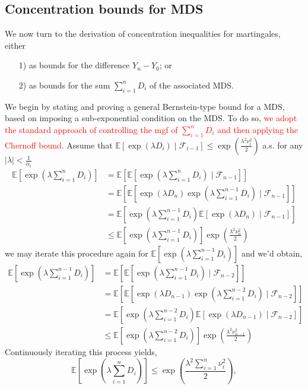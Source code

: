 \documentclass[10pt,handout,english]{beamer}
\newcommand{\E}{\mathbb{E}}
\newcommand{\F}{\mathcal{F}}
\begin{document}
\subsection{Concentration bounds for MDS}
\begin{frame}[allowframebreaks]
We now turn to the derivation of concentration inequalities for martingales, either
\begin{itemize}
\item[1)] as bounds for the difference $Y_n-Y_0$; or
\item[2)] as bounds for the sum $\sum_{i=1}^nD_i$ of the associated MDS.
\end{itemize}
We begin by stating and proving a general Bernstein-type bound for a MDS, based on imposing a sub-exponential condition on the MDS. To do so, \textcolor{red}{we adopt the standard approach of controlling the mgf of $\sum_{i=1}^{n}D_i$ and then applying the Chernoff bound}. Assume that $\E[\exp(\lambda D_i)\mid\F_{i-1}]\leq\exp\left(\frac{\lambda^2\nu^2_i}{2}\right)$ a.s. for any $\lvert\lambda\rvert<\frac{1}{\alpha_i}$
\begingroup
\allowdisplaybreaks
\begin{align*}
\E[\exp(\lambda\sum_{i=1}^n D_i)]&=\E[\E[\exp(\lambda\sum_{i=1}^n D_i)\mid\F_{n-1}]]\\
&=\E[\E[\exp(\lambda D_n)\exp(\lambda\sum_{i=1}^{n-1} D_i)\mid\F_{n-1}]]\\
&=\E[\exp(\lambda\sum_{i=1}^{n-1} D_i)\E[\exp(\lambda D_n)\mid\F_{n-1}]]\\
&\leq\E[\exp(\lambda\sum_{i=1}^{n-1} D_i)]\exp\left(\frac{\lambda^2\nu^2_n}{2}\right)
\end{align*} 
\endgroup
we may iterate this procedure again for $\E[\exp(\lambda\sum_{i=1}^{n-1} D_i)]$ and we'd obtain,
\begingroup
\allowdisplaybreaks
\begin{align*}
\E[\exp(\lambda\sum_{i=1}^{n-1} D_i)]&=\E[\E[\exp(\lambda\sum_{i=1}^{n-1} D_i)\mid\F_{n-2}]]\\
&=\E[\E[\exp(\lambda D_{n-1})\exp(\lambda\sum_{i=1}^{n-2} D_i)\mid\F_{n-2}]]\\
&=\E[\exp(\lambda\sum_{i=1}^{n-2} D_i)\E[\exp(\lambda D_{n-1})\mid\F_{n-2}]]\\
&\leq\E[\exp(\lambda\sum_{i=1}^{n-2} D_i)]\exp\left(\frac{\lambda^2\nu^2_{n-1}}{2}\right)
\end{align*} 
\endgroup
Continuously iterating this process yields,
\[
\E[\exp(\lambda\sum_{i=1}^n D_i)]\leq\exp\left(\frac{\lambda^2\sum_{i=1}^{n}\nu_i^2}{2}\right), 
\]
\end{frame}
\end{document}
